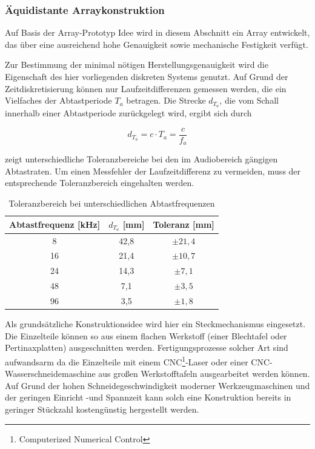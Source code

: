 \subsubsection{Äquidistante Arraykonstruktion}
Auf Basis der Array-Prototyp Idee wird in diesem Abschnitt ein Array entwickelt, das über eine ausreichend hohe Genauigkeit sowie mechanische Festigkeit verfügt.

Zur Bestimmung der minimal nötigen Herstellungsgenauigkeit wird die Eigenschaft des hier vorliegenden diskreten Systems genutzt. Auf Grund der Zeitdiskretisierung können nur Laufzeitdifferenzen gemessen werden, die ein Vielfaches der Abtastperiode $T_a$ betragen. Die Strecke $d_{T_a}$, die vom Schall innerhalb einer Abtastperiode zurückgelegt wird, ergibt sich durch

\begin{equation}
    d_{T_a} = c \cdot T_a = \frac{c}{f_a}
\end{equation}

 zeigt unterschiedliche Toleranzbereiche bei den im Audiobereich gängigen Abtastraten. Um einen Messfehler der Laufzeitdifferenz zu vermeiden, muss der entsprechende Toleranzbereich eingehalten werden.


\begin{table}[h]
     \center
     \begin{tabular}{ccc}
     \hline
          Abtastfrequenz [kHz] & $d_{T_a}$ [mm] & Toleranz [mm] \\
           \hline \hline
          8                    & 42,8           & $\pm 21,4$\\
          16                   & 21,4           & $\pm 10,7$\\
          24                   & 14,3           & $\pm 7,1$\\
          48                   & 7,1            & $\pm 3,5$\\
          96                   & 3,5            & $\pm 1,8$\\
         \hline
     \end{tabular}
  \caption{Toleranzbereich bei unterschiedlichen Abtastfrequenzen}
 \label{tab:Toleranz_Abtastfrequenz}
 \end{table}


Als grundsätzliche Konstruktionsidee wird hier ein Steckmechanismus eingesetzt. Die Einzelteile können so aus einem flachen Werkstoff (\zB einer Blechtafel oder Pertinaxplatten) ausgeschnitten werden. Fertigungsprozesse solcher Art sind aufwandsarm da die Einzelteile mit einem CNC\footnote{Computerized Numerical Control}-Laser oder einer CNC-Wasserschneidemaschine aus großen Werkstofftafeln ausgearbeitet werden können. Auf Grund der hohen Schneidegeschwindigkeit moderner Werkzeugmaschinen und der geringen Einricht -und Spannzeit kann solch eine Konstruktion bereits in geringer Stückzahl kostengünstig hergestellt werden.

